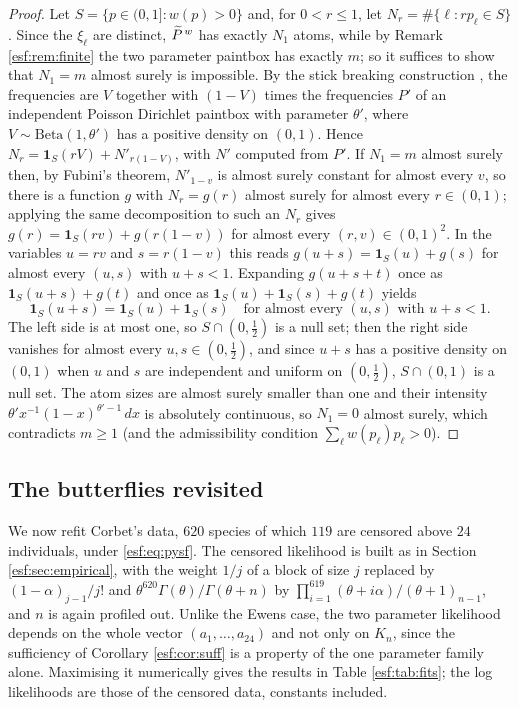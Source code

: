 \begin{proof}
Let $S = \{p \in (0,1] : w(p) > 0\}$ and, for $0 < r \le 1$, let $N_r = \#\{\ell : r p_\ell \in S\}$. Since the $\xi_\ell$ are distinct, $\widetilde{P}^{\, w}$ has exactly $N_1$ atoms, while by Remark \ref{esf:rem:finite} the two parameter paintbox has exactly $m$; so it suffices to show that $N_1 = m$ almost surely is impossible. By the stick breaking construction \citep{esf:pitmanyor1997}, the frequencies are $V$ together with $(1-V)$ times the frequencies $P'$ of an independent Poisson Dirichlet paintbox with parameter $\theta'$, where $V \sim \mathrm{Beta}(1,\theta')$ has a positive density on $(0,1)$. Hence $N_r = \mathbf{1}_S(rV) + N'_{r(1-V)}$, with $N'$ computed from $P'$. If $N_1 = m$ almost surely then, by Fubini's theorem, $N'_{1-v}$ is almost surely constant for almost every $v$, so there is a function $g$ with $N_r = g(r)$ almost surely for almost every $r \in (0,1)$; applying the same decomposition to such an $N_r$ gives $g(r) = \mathbf{1}_S(rv) + g(r(1-v))$ for almost every $(r, v) \in (0,1)^2$. In the variables $u = rv$ and $s = r(1-v)$ this reads $g(u+s) = \mathbf{1}_S(u) + g(s)$ for almost every $(u,s)$ with $u + s < 1$. Expanding $g(u+s+t)$ once as $\mathbf{1}_S(u+s) + g(t)$ and once as $\mathbf{1}_S(u) + \mathbf{1}_S(s) + g(t)$ yields
\[
\mathbf{1}_S(u+s) = \mathbf{1}_S(u) + \mathbf{1}_S(s) \quad \text{for almost every } (u,s) \text{ with } u + s < 1 .
\]
The left side is at most one, so $S \cap (0,\tfrac12)$ is a null set; then the right side vanishes for almost every $u, s \in (0, \tfrac12)$, and since $u + s$ has a positive density on $(0,1)$ when $u$ and $s$ are independent and uniform on $(0,\tfrac12)$, $S \cap (0,1)$ is a null set. The atom sizes are almost surely smaller than one and their intensity $\theta' x^{-1}(1-x)^{\theta'-1}\,dx$ is absolutely continuous, so $N_1 = 0$ almost surely, which contradicts $m \ge 1$ (and the admissibility condition $\sum_\ell w(p_\ell)p_\ell > 0$).
\end{proof}

\subsection{The butterflies revisited}
\label{esf:sec:butterflies2}

We now refit Corbet's data, $620$ species of which $119$ are censored above $24$ individuals, under
\eqref{esf:eq:pysf}. The censored likelihood is built as in Section \ref{esf:sec:empirical}, with the weight $1/j$ of a block of size $j$ replaced by $(1-\alpha)_{j-1}/j!$ and $\theta^{620}\Gamma(\theta)/\Gamma(\theta+n)$ by $\prod_{i=1}^{619}(\theta+i\alpha)/(\theta+1)_{n-1}$, and $n$ is again profiled out. Unlike the Ewens case, the two parameter likelihood depends on the
whole vector $(a_1, \dots, a_{24})$ and not only on $K_n$, since the sufficiency of
Corollary \ref{esf:cor:suff} is a property of the one parameter family alone. Maximising it numerically gives the results in Table \ref{esf:tab:fits}; the log likelihoods are those of the censored data, constants included.

